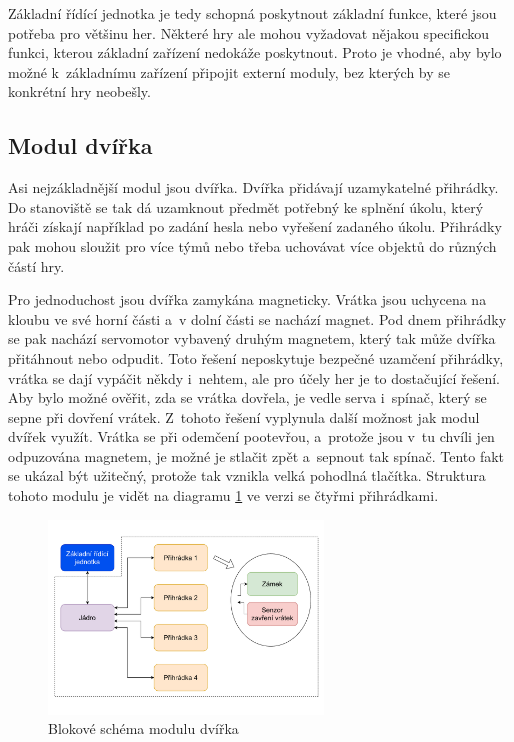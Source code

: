 Základní řídící jednotka je tedy schopná poskytnout základní funkce, které jsou potřeba pro většinu her.
Některé hry ale mohou vyžadovat nějakou specifickou funkci, kterou základní zařízení nedokáže poskytnout.
Proto je vhodné, aby bylo možné k~základnímu zařízení připojit externí moduly, bez kterých by se konkrétní hry neobešly.

\subsection{Modul dvířka}
Asi nejzákladnější modul jsou dvířka.
Dvířka přidávají uzamykatelné přihrádky.
Do stanoviště se tak dá uzamknout předmět potřebný ke splnění úkolu, který hráči získají například po zadání hesla nebo vyřešení zadaného úkolu.
Přihrádky pak mohou sloužit pro více týmů nebo třeba uchovávat více objektů do různých částí hry.

Pro jednoduchost jsou dvířka zamykána magneticky.
Vrátka jsou uchycena na kloubu ve své horní části a~v dolní části se nachází magnet.
Pod dnem přihrádky se pak nachází servomotor vybavený druhým magnetem, který tak může dvířka přitáhnout nebo odpudit.
Toto řešení neposkytuje bezpečné uzamčení přihrádky, vrátka se dají vypáčit někdy i~nehtem, ale pro účely her je to dostačující řešení.
Aby bylo možné ověřit, zda se vrátka dovřela, je vedle serva i~spínač, který se sepne při dovření vrátek.
Z~tohoto řešení vyplynula další možnost jak modul dvířek využít.
Vrátka se při odemčení pootevřou, a~protože jsou v~tu chvíli jen odpuzována magnetem, je možné je stlačit zpět a~sepnout tak spínač.
Tento fakt se ukázal být užitečný, protože tak vznikla velká pohodlná tlačítka.
Struktura tohoto modulu je vidět na diagramu \ref{fig:diagram_dvirka} ve verzi se čtyřmi přihrádkami.

\begin{figure}[h]
    \centering
    \includegraphics[width=0.65\textwidth]{text/TeoretickyUvod/AplikaceHernichZarizeni/diagram/Dvirka.drawio.pdf}
    \caption{Blokové schéma modulu dvířka}
    \label{fig:diagram_dvirka}
\end{figure}
 
